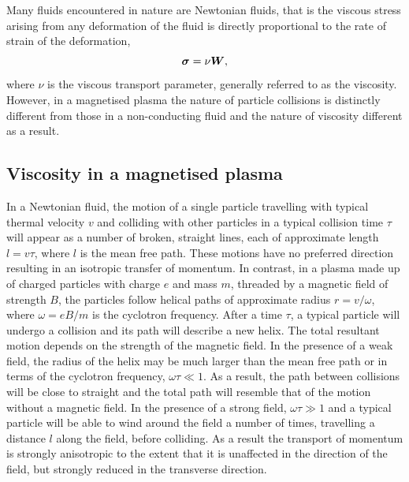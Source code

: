 Many fluids encountered in nature are Newtonian fluids, that is the viscous stress arising from any deformation of the fluid is directly proportional to the rate of strain of the deformation,
\begin{equation}
  \label{eq:isotropic_viscous_tensor}
  {\bm \sigma} = \nu {\bm W},
\end{equation}
where $\nu$ is the viscous transport parameter, generally referred to as the viscosity. However, in a magnetised plasma the nature of particle collisions is distinctly different from those in a non-conducting fluid and the nature of viscosity different as a result.

\subsection{Viscosity in a magnetised plasma}

\label{sec:visc_in_magnetised_plasma}

In a Newtonian fluid, the motion of a single particle travelling with typical thermal velocity $v$ and colliding with other particles in a typical collision time $\tau$ will appear as a number of broken, straight lines, each of approximate length $l = v\tau$, where $l$ is the mean free path. These motions have no preferred direction resulting in an isotropic transfer of momentum. In contrast, in a plasma made up of charged particles with charge $e$ and mass $m$, threaded by a magnetic field of strength $B$, the particles follow helical paths of approximate radius $r = v/\omega$, where $\omega = eB/m$ is the cyclotron frequency. After a time $\tau$, a typical particle will undergo a collision and its path will describe a new helix. The total resultant motion depends on the strength of the magnetic field. In the presence of a weak field, the radius of the helix may be much larger than the mean free path or in terms of the cyclotron frequency, $\omega \tau \ll 1$. As a result, the path between collisions will be close to straight and the total path will resemble that of the motion without a magnetic field. In the presence of a strong field, $\omega \tau \gg 1$ and a typical particle will be able to wind around the field a number of times, travelling a distance $l$ along the field, before colliding. As a result the transport of momentum is strongly anisotropic to the extent that it is unaffected in the direction of the field, but strongly reduced in the transverse direction.

